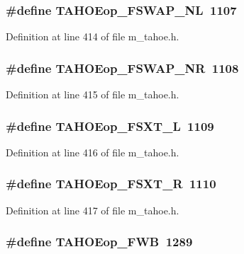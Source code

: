 \subsubsection{\setlength{\rightskip}{0pt plus 5cm}\#define TAHOEop\_\-FSWAP\_\-NL~1107}\label{m__tahoe_8h_1859a544e1059c8bc9fad1656e722473}




Definition at line 414 of file m\_\-tahoe.h.
\subsubsection{\setlength{\rightskip}{0pt plus 5cm}\#define TAHOEop\_\-FSWAP\_\-NR~1108}\label{m__tahoe_8h_bc8870645963f7521820a36b0f80b147}




Definition at line 415 of file m\_\-tahoe.h.
\subsubsection{\setlength{\rightskip}{0pt plus 5cm}\#define TAHOEop\_\-FSXT\_\-L~1109}\label{m__tahoe_8h_3207e3d9b9977ad0996e920b11b4aef2}




Definition at line 416 of file m\_\-tahoe.h.
\subsubsection{\setlength{\rightskip}{0pt plus 5cm}\#define TAHOEop\_\-FSXT\_\-R~1110}\label{m__tahoe_8h_ed955eb92d039b836bb4f99d4214dc25}




Definition at line 417 of file m\_\-tahoe.h.
\subsubsection{\setlength{\rightskip}{0pt plus 5cm}\#define TAHOEop\_\-FWB~1289}\label{m__tahoe_8h_d019e37b5ae562cc348257c2ba7195cf}




